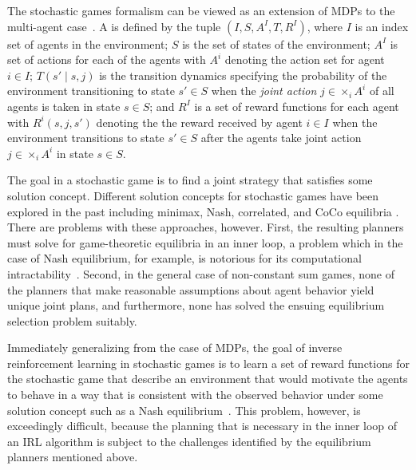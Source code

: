 The stochastic games formalism can be viewed as an extension of MDPs
to the multi-agent case~\cite{littman1994markov}. 
A  is defined by the tuple $(I, S, A^I, T,
R^I)$, where $I$ is an index set of agents in the environment; $S$ is
the set of states of the environment; $A^I$ is set of actions for each
of the agents with $A^i$ denoting the action set for agent $i \in I$;
$T(s' \mid s, j)$ is the transition dynamics specifying the
probability of the environment transitioning to state $s' \in S$ when
the {\em joint action} $j \in \times_i A^i$ of all agents is taken in
state $s \in S$; and $R^I$ is a set of reward functions for each agent
with $R^i(s, j, s')$ denoting the the reward received by agent
$i \in I$ when the environment transitions to state $s' \in S$ after
the agents take joint action $j \in \times_i A^i$ in state $s \in S$.

The goal in a stochastic game is to find a joint strategy that
satisfies some solution concept. Different solution concepts for
stochastic games have been explored in the past including minimax,
Nash, correlated, and CoCo equilibria
\cite{GreenwaldHall:03,HuWellman03,Littman01,ZGL:06}. There are
problems with these approaches, however. First, the resulting planners
must solve for game-theoretic equilibria in an inner loop, a problem
which in the case of Nash equilibrium, for example, is notorious for
its computational intractability~\cite{daskalakis2009complexity}. Second, in the
general case of non-constant sum games, none of the planners that make
reasonable assumptions about agent behavior yield unique joint plans,
and furthermore, none has solved the ensuing equilibrium selection
problem suitably.

Immediately generalizing from the case of MDPs, the goal of inverse
reinforcement learning in stochastic games is to learn a set of reward
functions for the stochastic game that describe an environment that
would motivate the agents to behave in a way that is consistent with
the observed behavior under some solution concept such as a Nash
equilibrium~\cite{reddy2012inverse}.  This problem, however, is
exceedingly difficult, because the planning that is necessary in the
inner loop of an IRL algorithm is subject to the challenges identified
by the equilibrium planners mentioned above.

